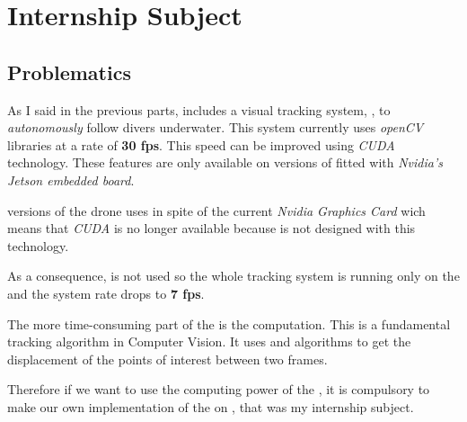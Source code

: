 
\chapter{Internship Subject} %

\label{Chapter3} %




\section{Problematics}

As I said in the previous parts, \iBubble{} includes a visual tracking system, , to \emph{autonomously} follow divers underwater. This system currently uses \emph{openCV} libraries at a rate of \textbf{30 fps}. This speed can be improved using \emph{CUDA} technology. These features are only available on  versions of \iBubble{} fitted with \emph{Nvidia's Jetson embedded board}.

 versions of the drone uses \rasp{} in spite of the current \emph{Nvidia Graphics Card} wich means that \emph{CUDA} is no longer available because \vc{} is not designed with this technology.

As a consequence, \vc{} is not used so the whole tracking system is running only on the \cpu{} and the system rate drops to \textbf{7 fps}.

The more time-consuming part of the  is the  computation. This is a fundamental tracking algorithm in Computer Vision. It uses  and  algorithms to get the displacement of the points of interest between two frames.

Therefore if we want to use the computing power of the \vc{}, it is compulsory to make our own implementation of the  on \rasp, that was my internship subject.

